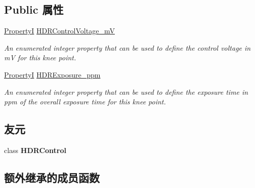 \subsection*{Public 属性}
\begin{DoxyCompactItemize}
\item 
\hypertarget{classmv_i_m_p_a_c_t_1_1acquire_1_1_h_d_r_knee_point_a52a344ecda4a61825d086cf74a8572c7}{\hyperlink{group___common_interface_ga12d5e434238ca242a1ba4c6c3ea45780}{Property\+I} \hyperlink{classmv_i_m_p_a_c_t_1_1acquire_1_1_h_d_r_knee_point_a52a344ecda4a61825d086cf74a8572c7}{H\+D\+R\+Control\+Voltage\+\_\+m\+V}}\label{classmv_i_m_p_a_c_t_1_1acquire_1_1_h_d_r_knee_point_a52a344ecda4a61825d086cf74a8572c7}

\begin{DoxyCompactList}\small\item\em An enumerated integer property that can be used to define the control voltage in m\+V for this knee point. \end{DoxyCompactList}\item 
\hypertarget{classmv_i_m_p_a_c_t_1_1acquire_1_1_h_d_r_knee_point_a43eae41d4e461d62ce4b78f0ccb45181}{\hyperlink{group___common_interface_ga12d5e434238ca242a1ba4c6c3ea45780}{Property\+I} \hyperlink{classmv_i_m_p_a_c_t_1_1acquire_1_1_h_d_r_knee_point_a43eae41d4e461d62ce4b78f0ccb45181}{H\+D\+R\+Exposure\+\_\+ppm}}\label{classmv_i_m_p_a_c_t_1_1acquire_1_1_h_d_r_knee_point_a43eae41d4e461d62ce4b78f0ccb45181}

\begin{DoxyCompactList}\small\item\em An enumerated integer property that can be used to define the exposure time in ppm of the overall exposure time for this knee point. \end{DoxyCompactList}\end{DoxyCompactItemize}
\subsection*{友元}
\begin{DoxyCompactItemize}
\item 
\hypertarget{classmv_i_m_p_a_c_t_1_1acquire_1_1_h_d_r_knee_point_a3f6df76ce2fc95c8c932c68db98385c8}{class {\bfseries H\+D\+R\+Control}}\label{classmv_i_m_p_a_c_t_1_1acquire_1_1_h_d_r_knee_point_a3f6df76ce2fc95c8c932c68db98385c8}

\end{DoxyCompactItemize}
\subsection*{额外继承的成员函数}


